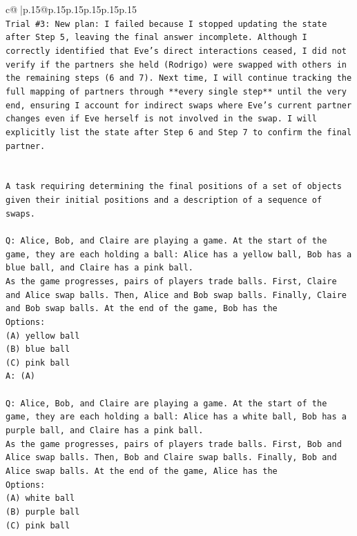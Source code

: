 \documentclass{article}
\begin{document}
{\begin{supertabular}{c@{$\;$}|p{.15\linewidth}@{}p{.15\linewidth}p{.15\linewidth}p{.15\linewidth}p{.15\linewidth}p{.15\linewidth}}
{{{\\ 
\texttt{Trial \#3: New plan: I failed because I stopped updating the state after Step 5, leaving the final answer incomplete. Although I correctly identified that Eve's direct interactions ceased, I did not verify if the partners she held (Rodrigo) were swapped with others in the remaining steps (6 and 7). Next time, I will continue tracking the full mapping of partners through **every single step** until the very end, ensuring I account for indirect swaps where Eve's current partner changes even if Eve herself is not involved in the swap. I will explicitly list the state after Step 6 and Step 7 to confirm the final partner.} \\
\\ 
\\ 
\texttt{A task requiring determining the final positions of a set of objects given their initial positions and a description of a sequence of swaps.} \\
\\ 
\texttt{Q: Alice, Bob, and Claire are playing a game. At the start of the game, they are each holding a ball: Alice has a yellow ball, Bob has a blue ball, and Claire has a pink ball.} \\
\texttt{As the game progresses, pairs of players trade balls. First, Claire and Alice swap balls. Then, Alice and Bob swap balls. Finally, Claire and Bob swap balls. At the end of the game, Bob has the} \\
\texttt{Options:} \\
\texttt{(A) yellow ball} \\
\texttt{(B) blue ball} \\
\texttt{(C) pink ball} \\
\texttt{A: (A)} \\
\\ 
\texttt{Q: Alice, Bob, and Claire are playing a game. At the start of the game, they are each holding a ball: Alice has a white ball, Bob has a purple ball, and Claire has a pink ball.} \\
\texttt{As the game progresses, pairs of players trade balls. First, Bob and Alice swap balls. Then, Bob and Claire swap balls. Finally, Bob and Alice swap balls. At the end of the game, Alice has the} \\
\texttt{Options:} \\
\texttt{(A) white ball} \\
\texttt{(B) purple ball} \\
\texttt{(C) pink ball} \\
}}}
\end{supertabular}}
\end{document}
